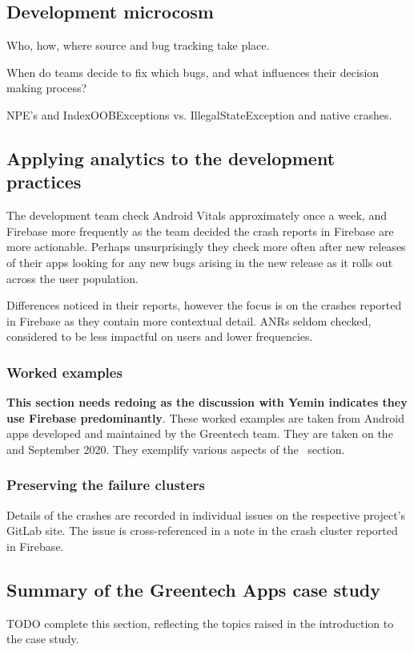 \subsection{Development microcosm}
Who, how, where source and bug tracking take place. 

When do teams decide to fix which bugs, and what influences their decision making process?

NPE's and IndexOOBExceptions vs. IllegalStateException and native crashes.

\subsection{Applying analytics to the development practices}

The development team check Android Vitals approximately once a week, and Firebase more frequently as the team decided the crash reports in Firebase are more actionable. Perhaps unsurprisingly they check more often after new releases of their apps looking for any new bugs arising in the new release as it rolls out across the user population.



Differences noticed in their reports, however the focus is on the crashes reported in Firebase as they contain more contextual detail. ANRs seldom checked, considered to be less impactful on users and lower frequencies.

\subsubsection{Worked examples}
\textbf{This section needs redoing as the discussion with Yemin indicates they use Firebase predominantly}.
These worked examples are taken from Android apps developed and maintained by the Greentech team. They are taken on the  and  September 2020. They exemplify various aspects of the~\href{section-select-aggregate-scope-analyse-triage-and-prioritise}{\MakeLowercase{\emph{}}} section. %



\subsubsection{Preserving the failure clusters}
Details of the crashes are recorded in individual issues on the respective project's GitLab site. The issue is cross-referenced in a note in the crash cluster reported in Firebase.




\subsection{Summary of the Greentech Apps case study}
TODO complete this section, reflecting the topics raised in the introduction to the case study.